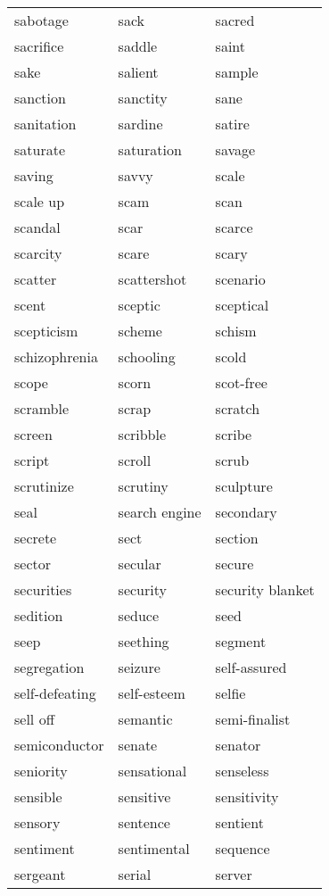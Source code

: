 \documentclass{minimal}
\begin{document}
\begin{longtable}{p{2.7cm}@{\hskip 0.2cm}p{2.7cm}@{\hskip 0.2cm}p{2.7cm}}
sabotage & sack & sacred \\
sacrifice & saddle & saint \\
sake & salient & sample \\
sanction & sanctity & sane \\
sanitation & sardine & satire \\
saturate & saturation & savage \\
saving & savvy & scale \\
scale up & scam & scan \\
scandal & scar & scarce \\
scarcity & scare & scary \\
scatter & scattershot & scenario \\
scent & sceptic & sceptical \\
scepticism & scheme & schism \\
schizophrenia & schooling & scold \\
scope & scorn & scot-free \\
scramble & scrap & scratch \\
screen & scribble & scribe \\
script & scroll & scrub \\
scrutinize & scrutiny & sculpture \\
seal & search engine & secondary \\
secrete & sect & section \\
sector & secular & secure \\
securities & security & security blanket \\
sedition & seduce & seed \\
seep & seething & segment \\
segregation & seizure & self-assured \\
self-defeating & self-esteem & selfie \\
sell off & semantic & semi-finalist \\
semiconductor & senate & senator \\
seniority & sensational & senseless \\
sensible & sensitive & sensitivity \\
sensory & sentence & sentient \\
sentiment & sentimental & sequence \\
sergeant & serial & server \\

\end{longtable}
\end{document}

